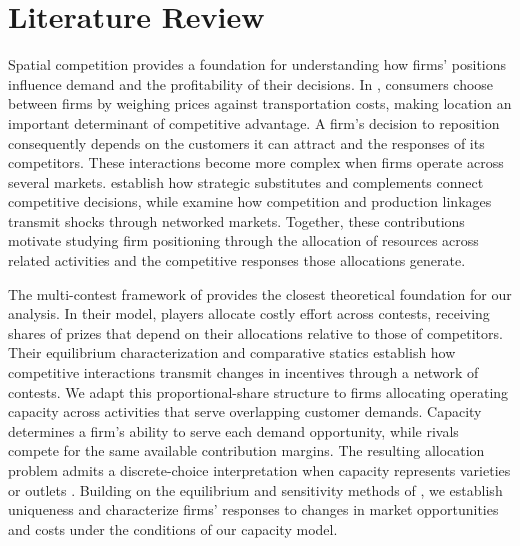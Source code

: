\section{Literature Review}\label{sec:literature}

Spatial competition provides a foundation for understanding how firms'
positions influence demand and the profitability of their decisions.
In \citet{hotelling_stability_1929}, consumers choose between firms by
weighing prices against transportation costs, making location an important
determinant of competitive advantage.
A firm's decision to reposition consequently depends on the customers it can
attract and the responses of its competitors.
These interactions become more complex when firms operate across several
markets. \citet{bulow_geanakoplos_klemperer_multimarket_1985} establish how
strategic substitutes and complements connect competitive decisions, while
\citet{bimpikis_ehsani_ilkilic_cournot_2019} examine how competition and
production linkages transmit shocks through networked markets.
Together, these contributions motivate studying firm positioning through the
allocation of resources across related activities and the competitive
responses those allocations generate.

The multi-contest framework of \citet{xu_zenou_zhou_conflict_2022} provides
the closest theoretical foundation for our analysis.
In their model, players allocate costly effort across contests, receiving
shares of prizes that depend on their allocations relative to those of competitors.
Their equilibrium characterization and comparative statics establish how
competitive interactions transmit changes in incentives through a network of contests.
We adapt this proportional-share structure to firms allocating operating
capacity across activities that serve overlapping customer demands.
Capacity determines a firm's ability to serve each demand opportunity, while
rivals compete for the same available contribution margins.
The resulting allocation problem admits a discrete-choice interpretation when
capacity represents varieties or outlets
\citep{mcfadden_conditional_logit_1974,train_discrete_choice_2009}.
Building on the equilibrium and sensitivity methods of
\citet{xu_zenou_zhou_conflict_2022}, we establish uniqueness and characterize
firms' responses to changes in market opportunities and costs under the
conditions of our capacity model.

